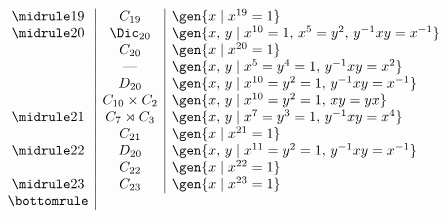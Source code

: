 \begin{displaymath}
\begin{array}{c|c|l}
\midrule
19 & C_{19} & \gen{x \mid x^{19} = 1} \\
\midrule
20 & \Dic_{20} & \gen{x,\,y \mid x^{10} = 1,\, x^5 = y^2,\, y^{-1}xy = x^{-1}} \\
   & C_{20} & \gen{x \mid x^{20} = 1} \\
   & \text{---} & \gen{x,\,y \mid x^5 = y^4 = 1,\, y^{-1}xy = x^2} \\
   & D_{20} & \gen{x,\,y \mid x^{10} = y^2 = 1,\, y^{-1}xy = x^{-1}} \\
   & C_{10} \times C_{2} & \gen{x,\,y \mid x^{10} = y^2 = 1,\, xy = yx} \\
\midrule
21 & C_{7} \rtimes C_3 & \gen{x,\,y \mid x^7 = y^3 = 1,\, y^{-1}xy = x^4} \\
   & C_{21} & \gen{x \mid x^{21} = 1} \\
\midrule
22 & D_{20} & \gen{x,\,y \mid x^{11} = y^2 = 1,\, y^{-1}xy = x^{-1}} \\
   & C_{22} & \gen{x \mid x^{22} = 1} \\
\midrule
23 & C_{23} & \gen{x \mid x^{23} = 1} \\
\bottomrule
\end{array}
\end{displaymath}
\vfill
\pagebreak

